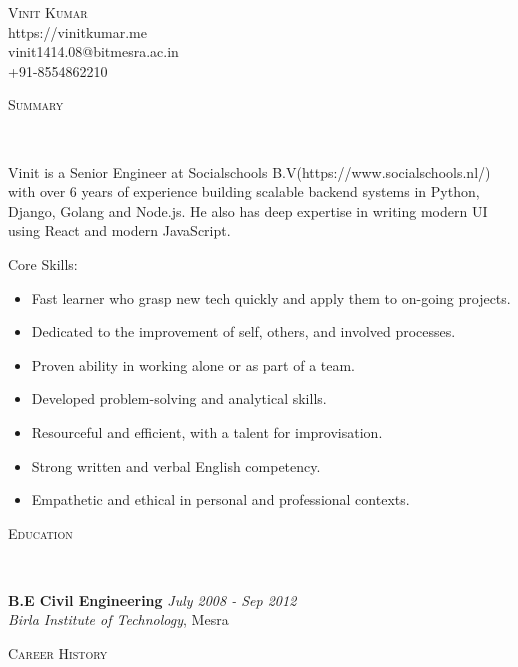 \documentclass[9pt]{article}
\newenvironment{changemargin}[2]{%
  \begin{list}{}{%
    \setlength{\topsep}{0pt}%
    \setlength{\leftmargin}{#1}%
    \setlength{\rightmargin}{#2}%
    \setlength{\listparindent}{\parindent}%
    \setlength{\itemindent}{\parindent}%
    \setlength{\parsep}{\parskip}%
  }%
  \item[]}{\end{list}
}
\newcommand{\lineover}{
    \begin{changemargin}{-0.05in}{-0.05in}
        \vspace*{-8pt}
        \hrulefill \\
        \vspace*{-2pt}
    \end{changemargin}
}
\newcommand{\header}[1]{
    \begin{changemargin}{-0.5in}{-0.5in}
        \scshape{#1}\\
    \lineover
    \end{changemargin}
}
\newcommand{\contact}[4]{
    \begin{changemargin}{-0.5in}{-0.5in}
        \begin{center}
            {\Large \scshape {#1}}\\ \smallskip
            {#2}\\ \smallskip
            {#3}\\ \smallskip
            {#4}\smallskip
        \end{center}
    \end{changemargin}
}
\newenvironment{body} {
    \vspace*{-16pt}
    \begin{changemargin}{-0.25in}{-0.5in}
  }
    {\end{changemargin}
}
\begin{document}
\contact{Vinit Kumar}{https://vinitkumar.me}{vinit1414.08@bitmesra.ac.in}{+91-8554862210}


\header{Summary}

\begin{body}
    \vspace{14pt}
Vinit is a Senior Engineer at Socialschools B.V(https://www.socialschools.nl/) with over 6 years of experience building scalable backend systems in Python, Django, Golang and Node.js. He also has deep expertise in writing modern UI using React and modern JavaScript.


Core Skills:
\begin{itemize} \itemsep -0pt
    \item Fast learner who grasp new tech quickly and apply them to on-going projects.
    \item Dedicated to the improvement of self, others, and involved processes.
    \item Proven ability in working alone or as part of a team.
    \item Developed problem-solving and analytical skills.
    \item Resourceful and efficient, with a talent for improvisation.
    \item Strong written and verbal English competency.
    \item Empathetic and ethical in personal and professional contexts.
\end{itemize}

\end{body}

\smallskip


\header{Education}

\begin{body}
    \vspace{14pt}
    \textbf{B.E Civil Engineering }{} \hfill \emph{July 2008 - Sep 2012}{} \\
    \emph{Birla Institute of Technology}, Mesra{} \\
\end{body}

\smallskip


\header{Career History}
\end{document}
